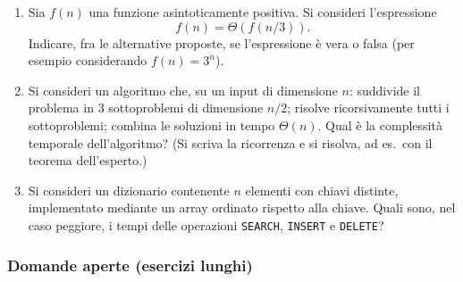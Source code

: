 \begin{enumerate}
		\item Sia $f(n)$ una funzione asintoticamente positiva. Si consideri l'espressione
		\[
		f(n) = \Theta\!\left(f(n/3)\right).
		\]
		Indicare, fra le alternative proposte, se l'espressione è vera o falsa (per esempio considerando $f(n)=3^n$).
		
		\item Si consideri un algoritmo che, su un input di dimensione $n$: suddivide il problema in $3$ sottoproblemi di dimensione $n/2$; risolve ricorsivamente tutti i sottoproblemi; combina le soluzioni in tempo $\Theta(n)$. Qual è la complessità temporale dell'algoritmo? (Si scriva la ricorrenza e si risolva, ad es.\ con il teorema dell'esperto.)
		
		\item Si consideri un dizionario contenente $n$ elementi con chiavi distinte, implementato mediante un array ordinato rispetto alla chiave. Quali sono, nel caso peggiore, i tempi delle operazioni \texttt{SEARCH}, \texttt{INSERT} e \texttt{DELETE}?
		
	\end{enumerate}
	
	\subsubsection{Domande aperte (esercizi lunghi)}
	
